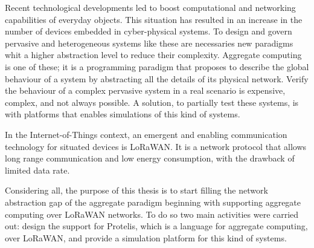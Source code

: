 Recent technological developments led to boost computational and networking capabilities of everyday objects. 
This situation has resulted in an increase in the number of devices embedded in cyber-physical systems.
To design and govern pervasive and heterogeneous systems like these are necessaries new paradigms whit a higher abstraction level to reduce their complexity.
Aggregate computing is one of these; it is a programming paradigm that proposes to describe the global behaviour of a system by abstracting all the details of its physical network.
Verify the behaviour of a complex pervasive system in a real scenario is expensive, complex, and not always possible.
A solution, to partially test these systems, is with platforms that enables simulations of this kind of systems.

In the Internet-of-Things context, an emergent and enabling communication technology for situated devices is LoRaWAN.
It is a network protocol that allows long range communication and low energy consumption, with the drawback of limited data rate.

Considering all, the purpose of this thesis is to start filling the network abstraction gap of the aggregate paradigm beginning with supporting aggregate computing over LoRaWAN networks.
To do so two main activities were carried out: design the support for Protelis, which is a language for aggregate computing, over LoRaWAN, and provide a simulation platform for this kind of systems. 